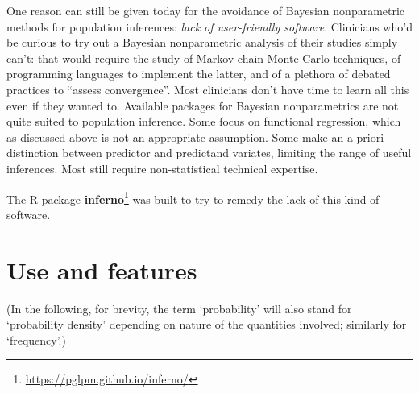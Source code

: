 \documentclass{article}
\begin{document}
One reason can still be given today for the avoidance of Bayesian nonparametric methods for population inferences: \emph{lack of user-friendly software}. Clinicians who'd be curious to try out a Bayesian nonparametric analysis of their studies simply can't: that would require the study of Markov-chain Monte Carlo techniques, of programming languages to implement the latter, and of a plethora of debated practices to ``assess convergence''. Most clinicians don't have time to learn all this even if they wanted to. Available packages for Bayesian nonparametrics are not quite suited to population inference. Some focus on functional regression, which as discussed above is not an appropriate assumption. Some make an a priori distinction between predictor and predictand variates, limiting the range of useful inferences. Most still require non-statistical technical expertise.

\medskip

The R-package \textbf{inferno}\footnote{\url{https://pglpm.github.io/inferno/}} was built to try to remedy the lack of this kind of software.

\section{Use and features}
\label{sec:features}

(In the following, for brevity, the term `probability' will also stand for `probability density' depending on nature of the quantities involved; similarly for `frequency'.)
\end{document}
